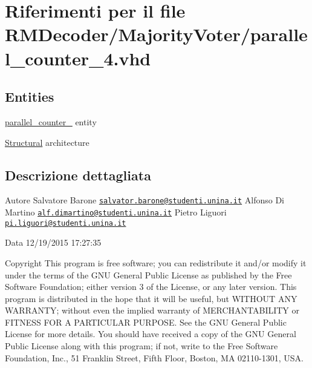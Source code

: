 \hypertarget{parallel__counter__4_8vhd}{\section{Riferimenti per il file R\+M\+Decoder/\+Majority\+Voter/parallel\+\_\+counter\+\_\+4.vhd}
\label{parallel__counter__4_8vhd}
}
\subsection*{Entities}
\begin{DoxyCompactItemize}
\item 
\hyperlink{classparallel__counter__4}{parallel\+\_\+counter\+\_} entity
\item 
\hyperlink{classparallel__counter__4_1_1_structural}{Structural} architecture
\end{DoxyCompactItemize}


\subsection{Descrizione dettagliata}
\begin{DoxyAuthor}{Autore}
Salvatore Barone \href{mailto:salvator.barone@studenti.unina.it}{\tt salvator.\+barone@studenti.\+unina.\+it} Alfonso Di Martino \href{mailto:alf.dimartino@studenti.unina.it}{\tt alf.\+dimartino@studenti.\+unina.\+it} Pietro Liguori \href{mailto:pi.liguori@studenti.unina.it}{\tt pi.\+liguori@studenti.\+unina.\+it} 
\end{DoxyAuthor}
\begin{DoxyDate}{Data}
12/19/2015 17\+:27\+:35
\end{DoxyDate}
\begin{DoxyCopyright}{Copyright}
This program is free software; you can redistribute it and/or modify it under the terms of the G\+N\+U General Public License as published by the Free Software Foundation; either version 3 of the License, or any later version. This program is distributed in the hope that it will be useful, but W\+I\+T\+H\+O\+U\+T A\+N\+Y W\+A\+R\+R\+A\+N\+T\+Y; without even the implied warranty of M\+E\+R\+C\+H\+A\+N\+T\+A\+B\+I\+L\+I\+T\+Y or F\+I\+T\+N\+E\+S\+S F\+O\+R A P\+A\+R\+T\+I\+C\+U\+L\+A\+R P\+U\+R\+P\+O\+S\+E. See the G\+N\+U General Public License for more details. You should have received a copy of the G\+N\+U General Public License along with this program; if not, write to the Free Software Foundation, Inc., 51 Franklin Street, Fifth Floor, Boston, M\+A 02110-\/1301, U\+S\+A. 
\end{DoxyCopyright}
